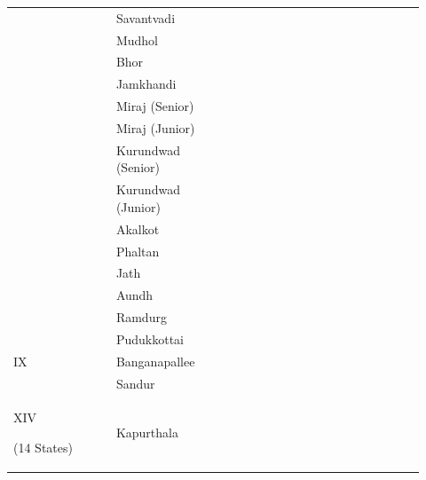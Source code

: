\begin{longtable}{|p{0.23\linewidth}|p{0.23\linewidth}|p{0.23\linewidth}|p{0.23\linewidth}|}
{} \\
\hline
 & Savantvadi

 \\
\hline
 & Mudhol

 \\
\hline
 & Bhor

 \\
\hline
 & Jamkhandi

 \\
\hline
 & Miraj (Senior)

 \\
\hline
 & Miraj (Junior)

 \\
\hline
 & Kurundwad (Senior)

 \\
\hline
 & Kurundwad (Junior)

 \\
\hline
 & Akalkot

 \\
\hline
 & Phaltan

 \\
\hline
 & Jath

 \\
\hline
 & Aundh

 \\
\hline
 & Ramdurg

 \\
\hline
\multirow{3}{*}{IX





} & Pudukkottai

 \\
\hline
 & Banganapallee

 \\
\hline
 & Sandur

 \\
\hline
\multirow{13}{*}{XIV











(14 States)













} & Kapurthala

 & \multirow{14}{*}{











}
\end{longtable}

